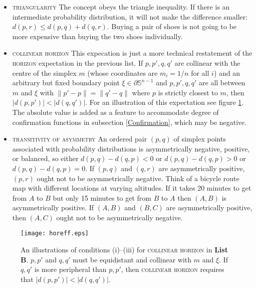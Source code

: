 \documentclass[11pt]{article}
\begin{document}
\begin{itemize}
\item \textsc{triangularity} The concept obeys the triangle
  inequality. If there is an intermediate probability distribution, it
  will not make the difference smaller: $d(p,r)\leq{}d(p,q)+d(q,r)$.
  Buying a pair of shoes is not going to be more expensive than buying
  the two shoes individually.
\item \textsc{collinear horizon} This expecation is just a more
  technical restatement of the \textsc{horizon} expectation in the
  previous list. If $p,p',q,q'$ are collinear with the centre of the
  simplex $m$ (whose coordinates are $m_{i}=1/n$ for all $i$) and an
  arbitrary but fixed boundary point $\xi\in\partial\mathbb{S}^{n-1}$
  and $p,p',q,q'$ are all between $m$ and $\xi$ with
  $\|p'-p\|=\|q'-q\|$ where $p$ is strictly closest to $m$, then
  $|d(p,p')|<|d(q,q')|$. For an illustration of this expectation see
  figure \ref{fig:conditions}. The absolute value is added as a
  feature to accommodate degree of confirmation functions in
  subsection \ref{Confirmation}, which may be negative.
\item \textsc{transitivity of asymmetry} An ordered pair $(p,q)$ of
  simplex points associated with probability distributions is
  asymmetrically negative, positive, or balanced, so either
  $d(p,q)-d(q,p)<0$ or $d(p,q)-d(q,p)>0$ or $d(p,q)-d(q,p)=0$. If
  $(p,q)$ and $(q,r)$ are asymmetrically positive, $(p,r)$ ought not
  to be asymmetrically negative. Think of a bicycle route map with
  different locations at varying altitudes. If it takes 20 minutes to
  get from $A$ to $B$ but only 15 minutes to get from $B$ to $A$ then
  $(A,B)$ is asymmetrically positive. If $(A,B)$ and $(B,C)$ are
  asymmetrically positive, then $(A,C)$ ought not to be asymmetrically
  negative.
\end{itemize}

\begin{figure}[ht]
  \begin{flushright}
    \begin{minipage}[h]{.7\linewidth}
      \texttt{[image: horeff.eps]}
      \caption{\footnotesize An illustrations of conditions (i)--(iii)
        for \textsc{collinear horizon} in \textbf{List B}. $p,p'$ and $q,q'$
        must be equidistant and collinear with $m$ and $\xi$. If
        $q,q'$ is more peripheral than $p,p'$, then \textsc{collinear
          horizon} requires that $|d(p,p')|<|d(q,q')|$.}
      \label{fig:conditions}
    \end{minipage}
  \end{flushright}
\end{figure}
\end{document}
